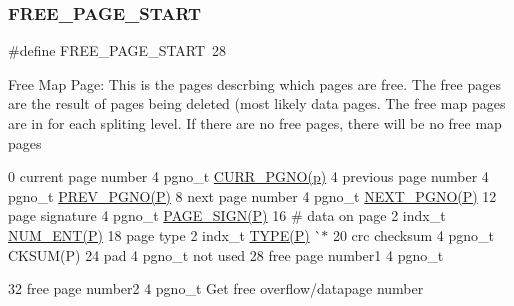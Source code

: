 \mbox{\label{adat-devel_2other__libs_2filedb_2filehash_2ffdb__page_8h_aa30dfddda34c8c72638b8784cdf5bb57}} 
\subsubsection{\texorpdfstring{FREE\_PAGE\_START}{FREE\_PAGE\_START}}
{\footnotesize\ttfamily \#define F\+R\+E\+E\+\_\+\+P\+A\+G\+E\+\_\+\+S\+T\+A\+RT~28}

Free Map Page\+: This is the pages descrbing which pages are free. The free pages are the result of pages being deleted (most likely data pages. The free map pages are in for each spliting level. If there are no free pages, there will be no free map pages

0 current page number 4 pgno\+\_\+t \mbox{\hyperlink{adat-devel_2other__libs_2filedb_2filehash_2ffdb__page_8h_a457153d6443527e77cf6c014418b3f0c}{C\+U\+R\+R\+\_\+\+P\+G\+N\+O(p)}} 4 previous page number 4 pgno\+\_\+t \mbox{\hyperlink{adat-devel_2other__libs_2filedb_2filehash_2ffdb__page_8h_a9f3ec51602d190743b13ac9322bea011}{P\+R\+E\+V\+\_\+\+P\+G\+N\+O(\+P)}} 8 next page number 4 pgno\+\_\+t \mbox{\hyperlink{adat-devel_2other__libs_2filedb_2filehash_2ffdb__page_8h_af1b39c2678bf46751c0a27214c45ac06}{N\+E\+X\+T\+\_\+\+P\+G\+N\+O(\+P)}} 12 page signature 4 pgno\+\_\+t \mbox{\hyperlink{adat-devel_2other__libs_2filedb_2filehash_2ffdb__page_8h_ae3a4cc6ec4e8e6abdeb46e9bc3746a00}{P\+A\+G\+E\+\_\+\+S\+I\+G\+N(\+P)}} 16 \# data on page 2 indx\+\_\+t \mbox{\hyperlink{adat-devel_2other__libs_2filedb_2filehash_2ffdb__page_8h_a2c1f890bf697f759dd5f4d7543d3d581}{N\+U\+M\+\_\+\+E\+N\+T(\+P)}} 18 page type 2 indx\+\_\+t \mbox{\hyperlink{adat-devel_2other__libs_2filedb_2filehash_2ffdb__page_8h_aa26538940485245e2d25f34c9438d924}{T\+Y\+P\+E(\+P)}} \`{}$\ast$ 20 crc checksum 4 pgno\+\_\+t C\+K\+S\+U\+M(\+P) 24 pad 4 pgno\+\_\+t not used 28 free page number1 4 pgno\+\_\+t

32 free page number2 4 pgno\+\_\+t Get free overflow/datapage number \mbox{\label{adat-devel_2other__libs_2filedb_2filehash_2ffdb__page_8h_a6774480bfaf9d831352ae726a66a5465}} 
